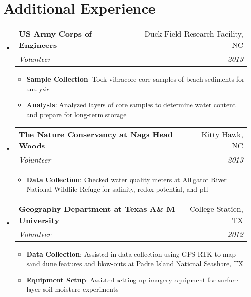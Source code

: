 \documentclass[letterpaper,11pt]{article}
\makeatletter
\newcommand{\resumeItem}[2]{
  \item\small{
    \textbf{#1}{: #2 \vspace{-2pt}}
  }
}
\newcommand{\resumeSubheading}[4]{
  \vspace{-1pt}\item
    \begin{tabular*}{0.97\textwidth}[t]{l@{\extracolsep{\fill}}r}
      \textbf{#1} & #2 \\
      \textit{\small#3} & \textit{\small #4} \\
    \end{tabular*}\vspace{-5pt}
}
\newcommand{\resumeSubHeadingListStart}{\begin{itemize}[leftmargin=*]}
\newcommand{\resumeSubHeadingListEnd}{\end{itemize}}
\newcommand{\resumeItemListStart}{\begin{itemize}}
\newcommand{\resumeItemListEnd}{\end{itemize}\vspace{-5pt}}
\makeatother
\begin{document}
\section{Additional Experience}
  \resumeSubHeadingListStart

      

 \resumeSubheading
      {US Army Corps of Engineers}{Duck Field Research Facility, NC}
      {Volunteer}{2013}
      \resumeItemListStart
      		\resumeItem{Sample Collection}
      		{Took vibracore core samples of beach sediments for analysis}
      		\resumeItem{Analysis}
      		{Analyzed layers of core samples to determine water content and prepare for long-term storage}
      \resumeItemListEnd
      
      
    \resumeSubheading
      {The Nature Conservancy at Nags Head Woods}{Kitty Hawk, NC}
      {Volunteer}{2013}
      \resumeItemListStart
        \resumeItem{Data Collection}
          {Checked water quality meters at Alligator River National Wildlife Refuge for salinity, redox potential, and pH}\\
      \resumeItemListEnd
      
     \resumeSubheading
      {Geography Department at Texas A\& M University}{College Station, TX}
      {Volunteer}{2012}
     \resumeItemListStart
     \resumeItem{Data Collection}
     {Assisted in data collection using GPS RTK to map sand dune features and blow-outs at Padre Island National Seashore, TX}
	 \resumeItem{Equipment Setup}
	 {Assisted setting up imagery equipment for surface layer soil moisture experiments}
	 \resumeItemListEnd
 
      
      
\resumeSubHeadingListEnd
\end{document}
